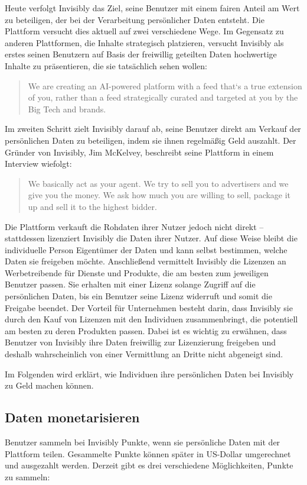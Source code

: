 \noindent Heute verfolgt Invisibly das Ziel, seine Benutzer mit einem fairen Anteil am Wert zu beteiligen, der bei der Verarbeitung persönlicher Daten entsteht. Die Plattform versucht dies aktuell auf zwei verschiedene Wege. Im Gegensatz zu anderen Plattformen, die Inhalte strategisch platzieren, versucht Invisibly als erstes seinen Benutzern auf Basis der freiwillig geteilten Daten hochwertige Inhalte zu präsentieren, die sie tatsächlich sehen wollen: \begin{quote}
    We are creating an AI-powered platform with a feed that`s a true extension of you, rather than a feed strategically curated and targeted at you by the Big Tech and brands. \cite{invisiblyWhyPay_2021}
\end{quote} Im zweiten Schritt zielt Invisibly darauf ab, seine Benutzer direkt am Verkauf der persönlichen Daten zu beteiligen, indem sie ihnen regelmäßig Geld auszahlt. \cite{invisiblyWhyPay_2021} Der Gründer von Invisibly, Jim McKelvey, beschreibt seine Plattform in einem Interview wiefolgt: \begin{quote}
    We basically act as your agent. We try to sell you to advertisers and we give you the money. We ask how much you are willing to sell, package it up and sell it to the highest bidder. \cite{techRadarInvisibly_2021}
\end{quote} Die Plattform verkauft die Rohdaten ihrer Nutzer jedoch nicht direkt -- stattdessen lizenziert Invisibly die Daten ihrer Nutzer. Auf diese Weise bleibt die individuelle Person Eigentümer der Daten und kann selbst bestimmen, welche Daten sie freigeben möchte. \cite{invisiblyGetPaid_2021} Anschließend vermittelt Invisibly die Lizenzen an Werbetreibende für Dienste und Produkte, die am besten zum jeweiligen Benutzer passen. Sie erhalten mit einer Lizenz solange Zugriff auf die persönlichen Daten, bis ein Benutzer seine Lizenz widerruft und somit die Freigabe beendet. Der Vorteil für Unternehmen besteht darin, dass Invisibly sie durch den Kauf von Lizenzen mit den Individuen zusammenbringt, die potentiell am besten zu deren Produkten passen. \cite{techRadarInvisibly_2021} Dabei ist es wichtig zu erwähnen, dass Benutzer von Invisibly ihre Daten freiwillig zur Lizenzierung freigeben und deshalb wahrscheinlich von einer Vermittlung an Dritte nicht abgeneigt sind. \newline

\noindent Im Folgenden wird erklärt, wie Individuen ihre persönlichen Daten bei Invisibly zu Geld machen können.

\subsection{Daten monetarisieren}
Benutzer sammeln bei Invisibly Punkte, wenn sie persönliche Daten mit der Plattform teilen. Gesammelte Punkte können später in US-Dollar umgerechnet und ausgezahlt werden. Derzeit gibt es drei verschiedene Möglichkeiten, Punkte zu sammeln: \newline

